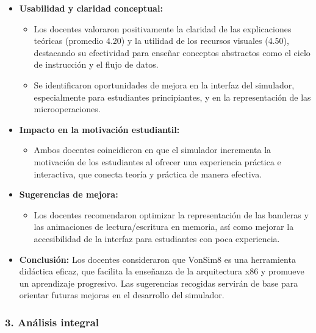 \documentclass[12pt,oneside]{templates/unerthesis}
\providecommand{\tightlist}{%
  \setlength{\itemsep}{0pt}\setlength{\parskip}{0pt}}
\begin{document}
\begin{itemize}
\tightlist
\item
  \textbf{Usabilidad y claridad conceptual:}

  \begin{itemize}
  \tightlist
  \item
    Los docentes valoraron positivamente la claridad de las explicaciones teóricas (promedio 4.20) y la utilidad de los recursos visuales (4.50), destacando su efectividad para enseñar conceptos abstractos como el ciclo de instrucción y el flujo de datos.
  \item
    Se identificaron oportunidades de mejora en la interfaz del simulador, especialmente para estudiantes principiantes, y en la representación de las microoperaciones.
  \end{itemize}
\item
  \textbf{Impacto en la motivación estudiantil:}

  \begin{itemize}
  \tightlist
  \item
    Ambos docentes coincidieron en que el simulador incrementa la motivación de los estudiantes al ofrecer una experiencia práctica e interactiva, que conecta teoría y práctica de manera efectiva.
  \end{itemize}
\item
  \textbf{Sugerencias de mejora:}

  \begin{itemize}
  \tightlist
  \item
    Los docentes recomendaron optimizar la representación de las banderas y las animaciones de lectura/escritura en memoria, así como mejorar la accesibilidad de la interfaz para estudiantes con poca experiencia.
  \end{itemize}
\item
  \textbf{Conclusión:}
  Los docentes consideraron que VonSim8 es una herramienta didáctica eficaz, que facilita la enseñanza de la arquitectura x86 y promueve un aprendizaje progresivo. Las sugerencias recogidas servirán de base para orientar futuras mejoras en el desarrollo del simulador.
\end{itemize}

\hypertarget{anuxe1lisis-integral}{%
\subsubsection{3. Análisis integral}\label{anuxe1lisis-integral}}
\end{document}
